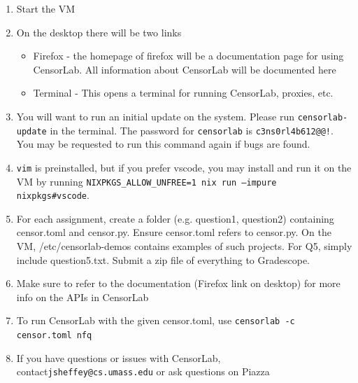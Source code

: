 \documentclass[12pt]{article}
\begin{document}
\begin{enumerate}
\begin{itemize}
    \end{itemize}
    \item Start the VM
    \item On the desktop there will be two links
    \begin{itemize}
        \item Firefox - the homepage of firefox will be a documentation page for using CensorLab. All information about CensorLab will be documented here
        \item Terminal - This opens a terminal for running CensorLab, proxies, etc.
    \end{itemize}
    \item You will want to run an initial update on the system. Please run \texttt{censorlab-update} in the terminal. The password for \texttt{censorlab} is \texttt{c3ns0rl4b612@@!}. You may be requested to run this command again if bugs are found.
    \item \texttt{vim} is preinstalled, but if you prefer vscode, you may install and run it on the VM by running \texttt{NIXPKGS\_ALLOW\_UNFREE=1 nix run --impure nixpkgs\#vscode}.
    \item For each assignment, create a folder (e.g. question1, question2) containing censor.toml and censor.py. Ensure censor.toml refers to censor.py. On the VM, /etc/censorlab-demos contains examples of such projects. For Q5, simply include question5.txt. Submit a zip file of everything to Gradescope.
    \item Make sure to refer to the documentation (Firefox link on desktop) for more info on the APIs in CensorLab 
    \item To run CensorLab with the given censor.toml, use \texttt{censorlab -c censor.toml nfq}
    \item If you have questions or issues with CensorLab, contact\texttt{jsheffey@cs.umass.edu} or ask questions on Piazza
\end{enumerate}
\newpage
% 
\end{document}

